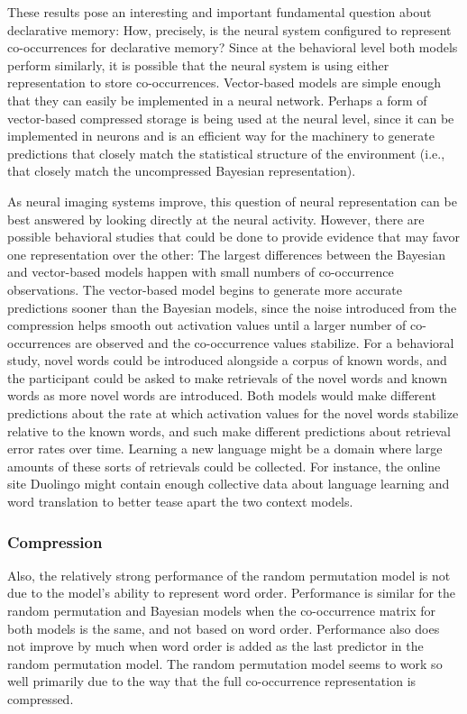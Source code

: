 \documentclass[man,floatsintext,donotrepeattitle]{apa6}
\begin{document}
These results pose an interesting and important fundamental question about declarative memory:
How, precisely, is the neural system configured to represent co-occurrences for declarative memory?
Since at the behavioral level both models perform similarly, it is possible that the neural system is using either representation to store co-occurrences.
Vector-based models are simple enough that they can easily be implemented in a neural network.
Perhaps a form of vector-based compressed storage is being used at the neural level,
since it can be implemented in neurons and is an efficient way for the machinery to generate predictions that closely match the statistical structure of the environment
(i.e., that closely match the uncompressed Bayesian representation).

As neural imaging systems improve, this question of neural representation can be best answered by looking directly at the neural activity.
However, there are possible behavioral studies that could be done to provide evidence that may favor one representation over the other:
The largest differences between the Bayesian and vector-based models happen with small numbers of co-occurrence observations.
The vector-based model begins to generate more accurate predictions sooner than the Bayesian models,
since the noise introduced from the compression helps smooth out activation values until a larger number of co-occurrences are observed and the co-occurrence values stabilize.
For a behavioral study, novel words could be introduced alongside a corpus of known words, and the participant could be asked to make retrievals of the novel words and known words as more novel words are introduced.
Both models would make different predictions about the rate at which activation values for the novel words stabilize relative to the known words, and such make different predictions about retrieval error rates over time.
Learning a new language might be a domain where large amounts of these sorts of retrievals could be collected.
For instance, the online site Duolingo might contain enough collective data about language learning and word translation to better tease apart the two context models.

\subsubsection{Compression}

Also, the relatively strong performance of the random permutation model is not due to the model's ability to represent word order.
Performance is similar for the random permutation and Bayesian models when the co-occurrence matrix for both models is the same, and not based on word order.
Performance also does not improve by much when word order is added as the last predictor in the random permutation model.
The random permutation model seems to work so well primarily due to the way that the full co-occurrence representation is compressed.
\end{document}
